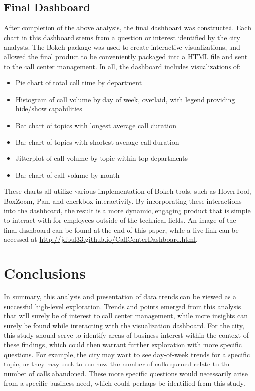 \documentclass{article}
\begin{document}
	\subsection{Final Dashboard}

After completion of the above analysis, the final dashboard was constructed.  Each chart in this dashboard stems from a question or interest identified by the city analysts.  The Bokeh package was used to create interactive visualizations, and allowed the final product to be conveniently packaged into a HTML file and sent to the call center management.  In all, the dashboard includes visualizations of:

\begin{itemize}
  \item{Pie chart of total call time by department}
  \item{Histogram of call volume by day of week, overlaid, with legend providing hide/show capabilities}
  \item{Bar chart of topics with longest average call duration}
  \item{Bar chart of topics with shortest average call duration}
  \item{Jitterplot of call volume by topic within top departments}
  \item{Bar chart of call volume by month}
\end{itemize}

These charts all utilize various implementation of Bokeh tools, such as HoverTool, BoxZoom, Pan, and checkbox interactivity.  By incorporating these interactions into the dashboard, the result is a more dynamic, engaging product that is simple to interact with for employees outside of the technical fields.  An image of the final dashboard can be found at the end of this paper, while a live link can be accessed at \href{http://jdbul33.github.io/CallCenterDashboard.html}{http://jdbul33.github.io/CallCenterDashboard.html}.


\section{Conclusions}

In summary, this analysis and presentation of data trends can be viewed as a successful high-level exploration.  Trends and points emerged from this analysis that will surely be of interest to call center management, while more insights can surely be found while interacting with the visualization dashboard.  For the city, this study should serve to identify areas of business interest within the context of these findings, which could then warrant further exploration with more specific questions.  For example, the city may want to see day-of-week trends for a specific topic, or they may seek to see how the number of calls queued relate to the number of calls abandoned.  These more specific questions would necessarily arise from a specific business need, which could perhaps be identified from this study.
\end{document}
